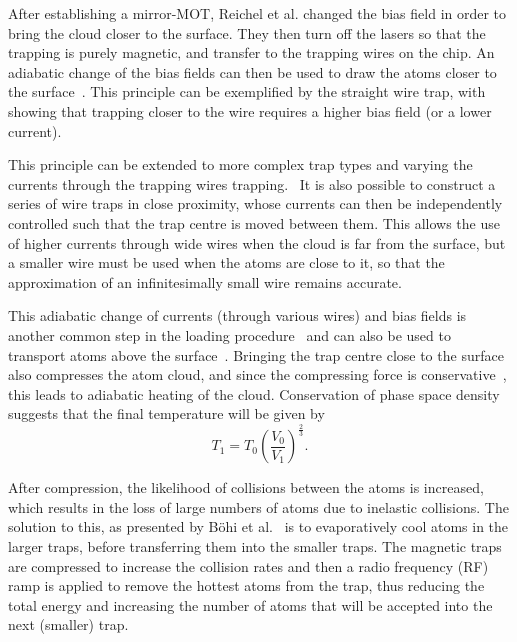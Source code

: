 After establishing a mirror-MOT, Reichel et al. changed the bias field in order
to bring the cloud closer to the surface. They then turn off the lasers so that
the trapping is purely magnetic, and transfer to the trapping
wires on the chip. An adiabatic change of the bias fields can then be used to
draw the atoms closer to the surface~\cite{Reichel1999, Folman2000}. This
principle can be exemplified by the straight wire trap, with
 showing that trapping closer to the wire requires a
higher bias field (or a lower current).

This principle can be extended to more complex trap types and varying the
currents through the trapping wires trapping.~\cite{Folman2000} It is also
possible to construct a series of wire traps in close proximity, whose currents
can then be independently controlled such that the trap centre is moved between
them. This allows the use of higher currents through wide wires when the cloud
is far from the surface, but a smaller wire must be used when the atoms are
close to it, so that the approximation of an infinitesimally small wire remains
accurate.

This adiabatic change of currents (through various wires) and bias fields is
another common step in the loading procedure~\cite{Folman2000,2011Ac,
RevModPhys.79.235} and can also be used to transport atoms above the
surface~\cite{Reichel1999, Schwindt2005}. Bringing the trap centre close to the
surface also compresses the atom cloud, and since the compressing force is
conservative~\cite{Metcalf1999}, this leads to adiabatic heating of the cloud.
Conservation of phase space density suggests that the final temperature will be
given by~\cite{Metcalf1999}
%
\begin{equation}
   T_1 = T_0\left(\frac{V_0}{V_1}\right)^\frac{2}{3}.
\end{equation}

After compression, the likelihood of collisions between the atoms is increased,
which results in the loss of large numbers of atoms due to inelastic collisions.
The solution to this, as presented by B\"ohi et al.~\cite{Boehi2009} is to
evaporatively cool atoms in the larger traps, before transferring them into the
smaller traps. The magnetic traps are compressed to increase the collision
rates and then a radio frequency (RF) ramp is applied to remove the hottest
atoms from the trap, thus reducing the total energy and increasing the number of
atoms that will be accepted into the next (smaller) trap.~\cite{Foot2005,
Metcalf1999}


